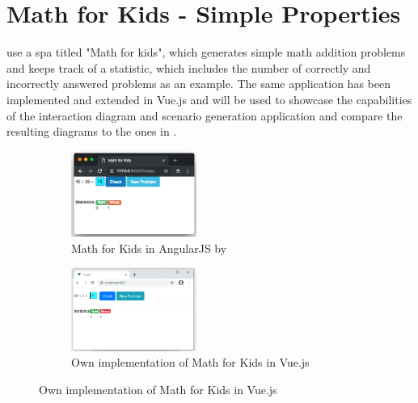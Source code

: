 \section{Math for Kids - Simple Properties}
\textcite{zhang2019scenario} use a \gls{spa} titled "Math for kids", which generates simple math addition problems and keeps track of a statistic, which includes the number of correctly and incorrectly answered problems as an example. The same application has been implemented and extended in Vue.js and will be used to showcase the capabilities of the interaction diagram and scenario generation application and compare the resulting diagrams to the ones in \parencite{zhang2019scenario}.

\begin{figure}[H]
    \centering
    \begin{subfigure}[t]{0.45\textwidth}
         \centering
         \includegraphics[width=0.45\textwidth]{images/math_for_kids_zhang.png}
         \caption{Math for Kids in AngularJS by \textcite{zhang2019scenario}}
    \end{subfigure}\hfill%
    \begin{subfigure}[t]{0.45\textwidth}
        \centering
        \includegraphics[width=0.45\textwidth]{images/math_for_kids_own.png}
        \caption{Own implementation of Math for Kids in Vue.js}
    \end{subfigure}
\end{figure}

